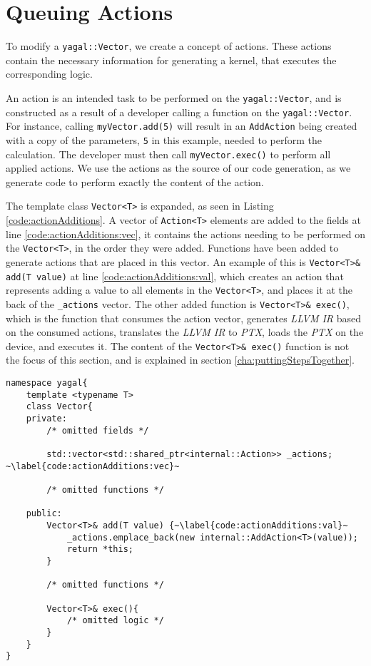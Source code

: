 \section{Queuing Actions} \label{cha:queueingActions}
To modify a \texttt{yagal::Vector}, we create a concept of actions. These actions contain the necessary information for generating a kernel, that executes the corresponding logic.

An action is an intended task to be performed on the \texttt{yagal::Vector}, and is constructed as a result of a developer calling a function on the \texttt{yagal::Vector}. For instance, calling \texttt{myVector.add(5)} will result in an \texttt{AddAction} being created with a copy of the parameters, \texttt{5} in this example, needed to perform the calculation. The developer must then call \texttt{myVector.exec()} to perform all applied actions. We use the actions as the source of our code generation, as we generate code to perform exactly the content of the action.

The template class \texttt{Vector<T>} is expanded, as seen in Listing \ref{code:actionAdditions}. A vector of \texttt{Action<T>} elements are added to the fields at line \ref{code:actionAdditions:vec}, it contains the actions needing to be performed on the \texttt{Vector<T>}, in the order they were added. Functions have been added to generate actions that are placed in this vector. An example of this is \texttt{Vector<T>\& add(T value)} at line \ref{code:actionAdditions:val}, which creates an action that represents adding a value to all elements in the \texttt{Vector<T>}, and places it at the back of the \texttt{\_actions} vector. The other added function is \texttt{Vector<T>\& exec()}, which is the function that consumes the action vector, generates \textit{LLVM IR} based on the consumed actions, translates the \textit{LLVM IR} to \textit{PTX}, loads the \textit{PTX} on the device, and executes it. The content of the \texttt{Vector<T>\& exec()} function is not the focus of this section, and is explained in section \ref{cha:puttingStepsTogether}.

\begin{lstlisting}[caption={Vector<T> action additions.}, label={code:actionAdditions}]
namespace yagal{
    template <typename T>
    class Vector{
    private:
        /* omitted fields */

        std::vector<std::shared_ptr<internal::Action>> _actions; ~\label{code:actionAdditions:vec}~

        /* omitted functions */
    
    public:
        Vector<T>& add(T value) {~\label{code:actionAdditions:val}~
            _actions.emplace_back(new internal::AddAction<T>(value));
            return *this;
        }
        
        /* omitted functions */

        Vector<T>& exec(){
            /* omitted logic */
        }
    }
}
\end{lstlisting}

